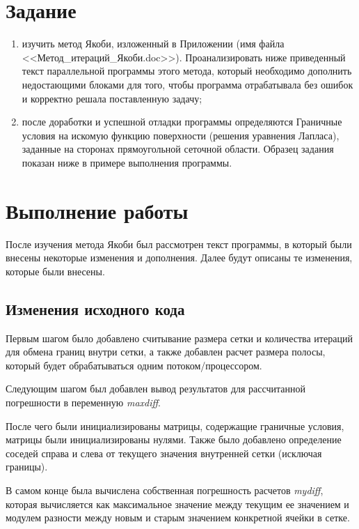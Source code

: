 \documentclass{altsu-bachelor}
\begin{document}
\section*{Задание}

\begin{enumerate}
    \item изучить метод Якоби, изложенный в Приложении (имя файла <<Метод\_итераций\_Якоби.doc>>). Проанализировать ниже приведенный текст параллельной программы этого метода, который необходимо дополнить недостающими блоками для того, чтобы программа отрабатывала без ошибок и корректно решала поставленную задачу;
    
    \item после доработки и успешной отладки программы определяются Граничные условия на искомую функцию поверхности (решения уравнения Лапласа), заданные на сторонах прямоугольной сеточной области. Образец задания показан ниже в примере выполнения программы.
\end{enumerate}

\section*{Выполнение работы}

После изучения метода Якоби был рассмотрен текст программы, в который были внесены некоторые изменения и дополнения. Далее будут описаны те изменения, которые были внесены.

\subsection*{Изменения исходного кода}

Первым шагом было добавлено считывание размера сетки и количества итераций для обмена границ внутри сетки, а также добавлен расчет размера полосы, который будет обрабатываться одним потоком/процессором.

Следующим шагом был добавлен вывод результатов для рассчитанной погрешности в переменную \textit{maxdiff}.

После чего были инициализированы матрицы, содержащие граничные условия, матрицы были инициализированы нулями. Также было добавлено определение соседей справа и слева от текущего значения внутренней сетки (исключая границы).

В самом конце была вычислена собственная погрешность расчетов \textit{mydiff}, которая вычисляется как максимальное значение между текущим ее значением и модулем разности между новым и старым значением конкретной ячейки в сетке.
\end{document}
